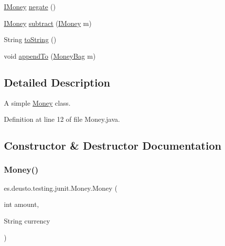 \begin{DoxyCompactItemize}
\item 
\mbox{\hyperlink{interfacees_1_1deusto_1_1testing_1_1junit_1_1_i_money}{I\+Money}} \mbox{\hyperlink{classes_1_1deusto_1_1testing_1_1junit_1_1_money_ae5f0bc3ea87f1fd55d6478653b8f2e36}{negate}} ()
\item 
\mbox{\hyperlink{interfacees_1_1deusto_1_1testing_1_1junit_1_1_i_money}{I\+Money}} \mbox{\hyperlink{classes_1_1deusto_1_1testing_1_1junit_1_1_money_aada973cd1a31410ed2b7e5d2ae6bc2e9}{subtract}} (\mbox{\hyperlink{interfacees_1_1deusto_1_1testing_1_1junit_1_1_i_money}{I\+Money}} m)
\item 
String \mbox{\hyperlink{classes_1_1deusto_1_1testing_1_1junit_1_1_money_af9e655069123757bea0efecc4efcd638}{to\+String}} ()
\item 
void \mbox{\hyperlink{classes_1_1deusto_1_1testing_1_1junit_1_1_money_aa9a6df9f35118060914ae6e8f74d1d51}{append\+To}} (\mbox{\hyperlink{classes_1_1deusto_1_1testing_1_1junit_1_1_money_bag}{Money\+Bag}} m)
\end{DoxyCompactItemize}


\subsection{Detailed Description}
A simple \mbox{\hyperlink{classes_1_1deusto_1_1testing_1_1junit_1_1_money}{Money}} class. 

Definition at line 12 of file Money.\+java.



\subsection{Constructor \& Destructor Documentation}
\mbox{\label{classes_1_1deusto_1_1testing_1_1junit_1_1_money_a6f1749eb364c59ed038f79cf8965e3bc}} 
\subsubsection{\texorpdfstring{Money()}{Money()}}
{\footnotesize\ttfamily es.\+deusto.\+testing.\+junit.\+Money.\+Money (\begin{DoxyParamCaption}\item[{int}]{amount,  }\item[{String}]{currency }\end{DoxyParamCaption})}

